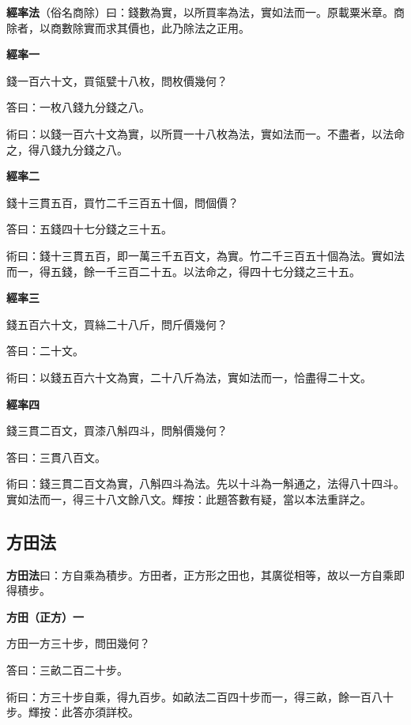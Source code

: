 \documentclass[11pt,a4paper]{article}
\newenvironment{problemenv}[1]{%
  \medskip\noindent\textbf{#1}\par\nopagebreak\smallskip
}{\medskip}
\begin{document}
\textbf{經率法}（俗名商除）曰：錢數為實，以所買率為法，實如法而一。原載粟米章。商除者，以商數除實而求其價也，此乃除法之正用。

\begin{problemenv}{經率一}
錢一百六十文，買瓴甓十八枚，問枚價幾何？

\textsf{答曰：}一枚八錢九分錢之八。

\textsf{術曰：}以錢一百六十文為實，以所買一十八枚為法，實如法而一。不盡者，以法命之，得八錢九分錢之八。
\end{problemenv}

\begin{problemenv}{經率二}
錢十三貫五百，買竹二千三百五十個，問個價？

\textsf{答曰：}五錢四十七分錢之三十五。

\textsf{術曰：}錢十三貫五百，即一萬三千五百文，為實。竹二千三百五十個為法。實如法而一，得五錢，餘一千三百二十五。以法命之，得四十七分錢之三十五。
\end{problemenv}

\begin{problemenv}{經率三}
錢五百六十文，買絲二十八斤，問斤價幾何？

\textsf{答曰：}二十文。

\textsf{術曰：}以錢五百六十文為實，二十八斤為法，實如法而一，恰盡得二十文。
\end{problemenv}

\begin{problemenv}{經率四}
錢三貫二百文，買漆八斛四斗，問斛價幾何？

\textsf{答曰：}三貫八百文。

\textsf{術曰：}錢三貫二百文為實，八斛四斗為法。先以十斗為一斛通之，法得八十四斗。實如法而一，得三十八文餘八文。輝按：此題答數有疑，當以本法重詳之。
\end{problemenv}

\subsection{方田法}

\textbf{方田法}曰：方自乘為積步。方田者，正方形之田也，其廣從相等，故以一方自乘即得積步。

\begin{problemenv}{方田（正方）一}
方田一方三十步，問田幾何？

\textsf{答曰：}三畝二百二十步。

\textsf{術曰：}方三十步自乘，得九百步。如畝法二百四十步而一，得三畝，餘一百八十步。輝按：此答亦須詳校。
\end{problemenv}
\end{document}
